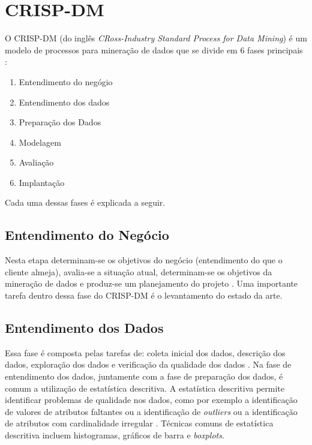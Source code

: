 \section{CRISP-DM}
O CRISP-DM (do inglês \textit{CRoss-Industry Standard Process for Data Mining}) é um
modelo de processos para mineração de dados que se divide em 6 fases principais
\cite{crispdm}:
\begin{enumerate}
    \item Entendimento do negógio
    \item Entendimento dos dados
    \item Preparação dos Dados
    \item Modelagem
    \item Avaliação
    \item Implantação
\end{enumerate}
Cada uma dessas fases é explicada a seguir.

\subsection{Entendimento do Negócio}
Nesta etapa determinam-se os objetivos do negócio (entendimento do que o cliente
almeja), avalia-se a situação atual, determinam-se os objetivos da mineração de dados
e produz-se um planejamento do projeto \cite{crispdm}. Uma importante tarefa dentro
dessa fase do CRISP-DM é o levantamento do estado da arte. 

\subsection{Entendimento dos Dados}
Essa fase é composta pelas tarefas de: coleta inicial dos dados, descrição dos dados,
exploração dos dados e verificação da qualidade dos dados \cite{crispdm}.
Na fase de entendimento dos dados, juntamente com a fase de preparação dos dados, 
é comum a utilização de estatística descritiva. A
estatística descritiva permite identificar problemas de qualidade nos dados, como por
exemplo a identificação de valores de atributos faltantes ou a identificação de
\textit{outliers} ou a identificação de atributos com cardinalidade irregular
\cite{ml_book}. Técnicas comuns de estatística descritiva incluem histogramas,
gráficos de barra e \textit{boxplots}. 

